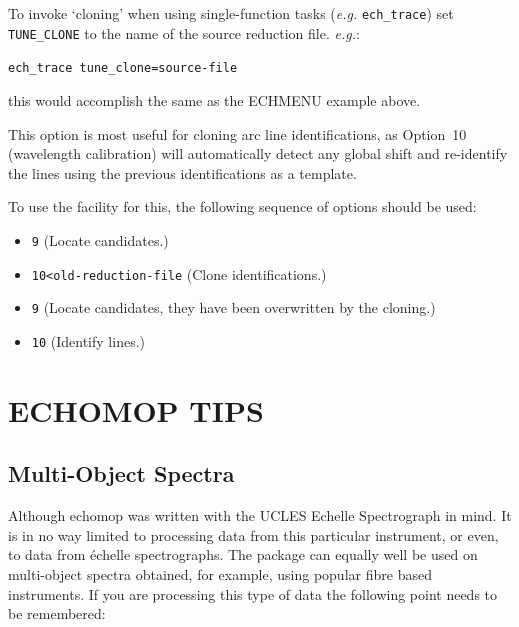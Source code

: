 \documentclass[11pt,twoside]{article}
\newcommand{\stardocinitials}  {SUN}
\newcommand{\stardocnumber}    {152.4}
\newcommand{\stardocname}{\stardocinitials /\stardocnumber}
\newcommand{\htmlref}[2]{#1}
\newcommand{\xlabel}[1]{}
\newcommand{\mlabel}[1]{\xlabel{#1}\label{#1}}
\newcommand{\myindex}[1]{\index{#1}}
\renewcommand{\myindex}[1]{}
\begin{document}
To invoke `cloning' when using single-function tasks ({\it{e.g.}}
\htmlref{{\tt{ech\_trace}}}{ech_trace}) set
\htmlref{{\tt{TUNE\_CLONE}}}{par_TUNE_CLONE} to the name of the source
reduction file. {\it{e.g.}}:

\texttt{ech\_trace tune\_clone=source-file}

this would accomplish the same as the ECHMENU example above.

\myindex{Wavelength scales!cloning}
This option is most useful for cloning arc line identifications, as
\htmlref{Option~10}{option10} (wavelength calibration) will automatically
detect any global shift and re-identify the lines using the previous
identifications as a template.
\myindex{Copy line identifications}
To use the facility for this, the following sequence of options
should be used:

\begin{itemize}

\item {\texttt{9} (Locate candidates.)}
\item {\texttt{10<old-reduction-file} (Clone identifications.)}
\item {\texttt{9} (Locate candidates, they have been overwritten by the
      cloning.)}
\item {\texttt{10} (Identify lines.)}

\end{itemize}


\section{\mlabel{tips}ECHOMOP TIPS}
\markboth{{\sc echomop} TIPS}{\stardocname}

\subsection{\mlabel{multi_object_spectra}Multi-Object Spectra}
\myindex{Multi-object frames}
\myindex{Fibre-fed spectrographs}

Although {\sc echomop} was written with the UCLES Echelle Spectrograph in mind.
It is in no way limited to processing data from this particular instrument,
or even, to data from \'{e}chelle spectrographs.  The package can equally well
be used on multi-object spectra obtained, for example, using popular
fibre based instruments.  If you are processing this type of data the
following point needs to be remembered:
\end{document}
